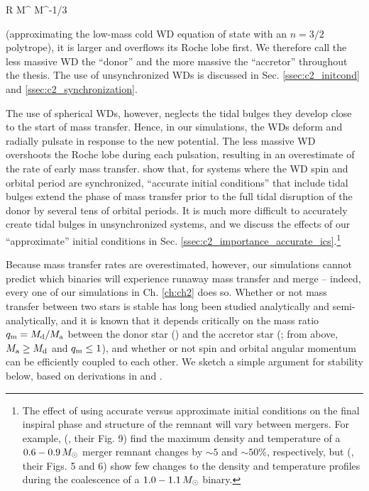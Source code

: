 \eqbegin
R \propto M^{} \approx M^{-1/3}
\label{eq:c1_massradiusrelation}
\eqend

\noindent (approximating the low-mass cold WD equation of state with an $n = 3/2$ polytrope), it is larger and overflows its Roche lobe first.  We therefore call the less massive WD the ``donor'' and the more massive the ``accretor'' throughout the thesis.  The use of unsynchronized WDs is discussed in Sec. \ref{ssec:c2_initcond} and \ref{ssec:c2_synchronization}.  

The use of spherical WDs, however, neglects the tidal bulges they develop close to the start of mass transfer.  Hence, in our simulations, the WDs deform and radially pulsate in response to the new potential.  The less massive WD overshoots the Roche lobe during each pulsation, resulting in an overestimate of the rate of early mass transfer.  \cite{dan+11} show that, for systems where the WD spin and orbital period are synchronized, ``accurate initial conditions'' that include tidal bulges extend the phase of mass transfer prior to the full tidal disruption of the donor by several tens of orbital periods.  It is much more difficult to accurately create tidal bulges in unsynchronized systems, and we discuss the effects of our ``approximate'' initial conditions in Sec. \ref{ssec:c2_importance_accurate_ics}.\footnote{The effect of using accurate versus approximate initial conditions on the final inspiral phase and structure of the remnant will vary between mergers.  For example, \citeauthor{dan+11} (\citeyear{dan+11}, their Fig. 9) find the maximum density and temperature of a $0.6-0.9\,\Msun$ merger remnant changes by $\sim5$ and $\sim50$\%, respectively, but \citeauthor{pakm+12sph} (\citeyear{pakm+12sph}, their Figs. 5 and 6) show few changes to the density and temperature profiles during the coalescence of a $1.0 - 1.1\,\Msun$ binary.}

Because mass transfer rates are overestimated, however, our simulations cannot predict which binaries will experience runaway mass transfer and merge -- indeed, every one of our simulations in Ch. \ref{ch:ch2} does so.  Whether or not mass transfer between two stars is stable has long been studied analytically and semi-analytically, and it is known that it depends critically on the mass ratio $\qm = \Md/\Ma$ between the donor star (\Md) and the accretor star (\Ma; from above, $\Ma \geq \Md$ and $\qm \leq 1$), and whether or not spin and orbital angular momentum can be efficiently coupled to each other.  We sketch a simple argument for stability below, based on derivations in \cite{marsns04} and \cite{dan+11}.

